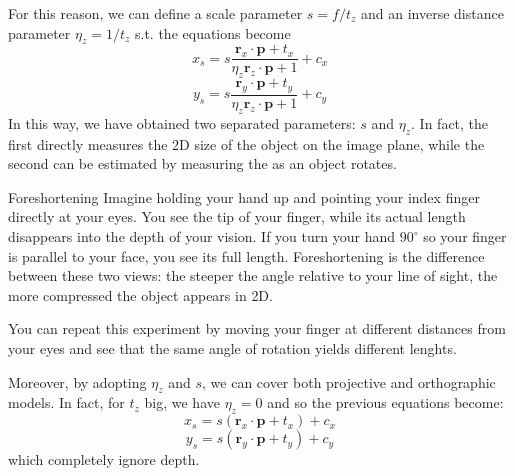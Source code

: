 For this reason, we can define a scale parameter $s=f / t_{z}$ and an inverse distance parameter $\eta_{z} = 1 / t_{z}$ s.t. the equations become
$$x_s = s \frac{\mathbf{r}_x \cdot \mathbf{p} + t_x}{\eta_{z}\mathbf{r}_z \cdot \mathbf{p} + 1} + c_x$$
$$y_s = s \frac{\mathbf{r}_y \cdot \mathbf{p} + t_y}{\eta_{z}\mathbf{r}_z \cdot \mathbf{p} + 1} + c_y$$
In this way, we have obtained two separated parameters: $s$ and $\eta_{z}$. In fact, the first directly measures the 2D size of the object on the image plane, while the second can be estimated by measuring the  as an object rotates.

\begin{observation}{Foreshortening}
    Imagine holding your hand up and pointing your index finger directly at your eyes.
    You see the tip of your finger, while its actual length disappears into the depth of your vision. 
    If you turn your hand $90^\circ$ so your finger is parallel to your face, you see its full length.
    Foreshortening is the difference between these two views: the steeper the angle relative to your line of sight, the more compressed the object appears in 2D.

    You can repeat this experiment by moving your finger at different distances from your eyes and see that the same angle of rotation yields different lenghts.
\end{observation}

Moreover, by adopting $\eta_{z}$ and $s$, we can cover both projective and orthographic models. In fact, for $t_{z}$ big, we have $\eta_{z}=0$ and so the previous equations become:
$$x_s = s(\mathbf{r}_x \cdot \mathbf{p} + t_x) + c_x$$
$$y_s = s(\mathbf{r}_y \cdot \mathbf{p} + t_y) + c_y$$
which completely ignore depth.

